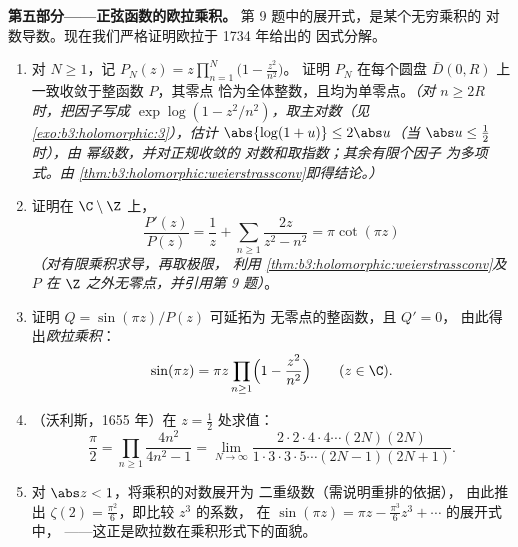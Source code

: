 \begin{problem}
\medskip
\noindent\textbf{第五部分——正弦函数的欧拉乘积。}
第 9 题中的展开式，是某个无穷乘积的
对数导数。现在我们严格证明欧拉于 1734 年给出的
因式分解。
\begin{enumerate}[resume]
  \item 对 $N \geq 1$，记 $P_N(z) =
        z\prod_{n=1}^{N}\bigl(1 - \frac{z^2}{n^2}\bigr)$。
        证明 $P_N$ 在每个圆盘
        $\bar D(0, R)$ 上一致收敛于整函数 $P$，其零点
        恰为全体整数，且均为单零点。\emph{（对 $n
        \geq 2R$ 时，把因子写成 $\exp\log(1 -
        z^2/n^2)$，取主对数（见
        \cref{exo:b3:holomorphic:3}），估计 $\abs{\log(1+u)}
        \leq 2\abs u$（当 $\abs u \leq \frac12$ 时），由
        幂级数，并对正规收敛的
        对数和取指数；其余有限个因子
        为多项式。由
        \cref{thm:b3:holomorphic:weierstrassconv}即得结论。）}
  \item 证明在 $\C\setminus\Z$ 上，
        \[
        \frac{P'(z)}{P(z)} = \frac1z +
        \sum_{n\geq1}\frac{2z}{z^2 - n^2} = \pi\cot(\pi z)
        \]
        \emph{（对有限乘积求导，再取极限，
        利用
        \cref{thm:b3:holomorphic:weierstrassconv}及
        $P$ 在 $\Z$ 之外无零点，并引用第
        9 题）}。
  \item 证明 $Q = \sin(\pi z)/P(z)$ 可延拓为
        无零点的整函数，且 $Q' = 0$，
        由此得出\emph{欧拉乘积}：
        \[
        \sin(\pi z) = \pi z\prod_{n\geq1}
        \Bigl(1 - \frac{z^2}{n^2}\Bigr)
        \qquad (z \in \C) .
        \]
  \item （沃利斯，1655 年）在 $z = \frac12$ 处求值：
        \[
        \frac\pi2 = \prod_{n\geq1}\frac{4n^2}{4n^2 - 1}
        = \lim_{N\to\infty}
        \frac{2\cdot2\cdot4\cdot4\cdots(2N)(2N)}
        {1\cdot3\cdot3\cdot5\cdots(2N-1)(2N+1)} .
        \]
  \item 对 $\abs z < 1$，将乘积的对数展开为
        二重级数（需说明重排的依据），
        由此推出 $\zeta(2) =
        \frac{\pi^2}6$，即比较 $z^3$ 的系数，
        在 $\sin(\pi z) = \pi z - \frac{\pi^3}6z^3 + \cdots$ 的展开式中，
——这正是欧拉数在乘积形式下的面貌。
\end{enumerate}


\end{problem}
